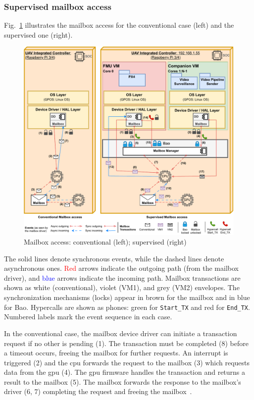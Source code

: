 \subsubsection{Supervised mailbox access}
\label{sec:superv-mailb-access}
Fig.~\ref{fig:design-mailbox} illustrates the mailbox access for the
conventional case (left) and the supervised one (right).

\begin{figure}[!hbt]
  \centering
  \includegraphics[width=1.0\textwidth]{./img/pdf/uav-main-design-mailbox} 
  \caption{Mailbox access: conventional (left); supervised (right)}%
  \label{fig:design-mailbox}
\end{figure}

The solid lines denote synchronous events, while the dashed lines denote
asynchronous ones.
\textcolor{red}{Red} arrows indicate the outgoing path (from the mailbox
driver), and \textcolor{blue}{blue} arrows indicate the incoming path. Mailbox
transactions are shown as white (conventional), violet (VM1), and grey (VM2)
envelopes. The synchronization mechanisms (locks) appear in brown for the
mailbox and in blue for Bao. Hypercalls are shown as phones: green for
\lstinline{Start_TX} and red for \lstinline{End_TX}. Numbered labels mark the
event sequence in each case.

In the conventional case, the mailbox device driver can initiate a transaction
request if no other is pending (1). The transaction must
be completed (8) before a timeout occurs, freeing the mailbox for further
requests. An interrupt is triggered (2) and the \gls{cpu} forwards the request
to the mailbox (3) which requests data from the \gls{gpu} (4). The \gls{gpu}
firmware handles the transaction and returns a result to the mailbox (5). The
mailbox forwards the response to the mailbox's driver (6, 7) completing
the request and freeing the mailbox~\cite{rpi4-mbox-driver}. 

